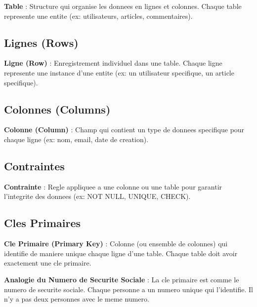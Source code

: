 \documentclass[a4paper,12pt]{book}
\begin{document}
\begin{definitionbox}
    \textbf{Table} : Structure qui organise les donnees en lignes et colonnes. Chaque table represente une entite (ex: utilisateurs, articles, commentaires).
\end{definitionbox}

\subsection{Lignes (Rows)}

\begin{definitionbox}
    \textbf{Ligne (Row)} : Enregistrement individuel dans une table. Chaque ligne represente une instance d'une entite (ex: un utilisateur specifique, un article specifique).
\end{definitionbox}

\subsection{Colonnes (Columns)}

\begin{definitionbox}
    \textbf{Colonne (Column)} : Champ qui contient un type de donnees specifique pour chaque ligne (ex: nom, email, date de creation).
\end{definitionbox}

\subsection{Contraintes}

\begin{definitionbox}
    \textbf{Contrainte} : Regle appliquee a une colonne ou une table pour garantir l'integrite des donnees (ex: NOT NULL, UNIQUE, CHECK).
\end{definitionbox}

\subsection{Cles Primaires}

\begin{definitionbox}
    \textbf{Cle Primaire (Primary Key)} : Colonne (ou ensemble de colonnes) qui identifie de maniere unique chaque ligne d'une table. Chaque table doit avoir exactement une cle primaire.
\end{definitionbox}

\begin{analogybox}
    \textbf{Analogie du Numero de Securite Sociale} : La cle primaire est comme le numero de securite sociale. Chaque personne a un numero unique qui l'identifie. Il n'y a pas deux personnes avec le meme numero.
\end{analogybox}
\end{document}
